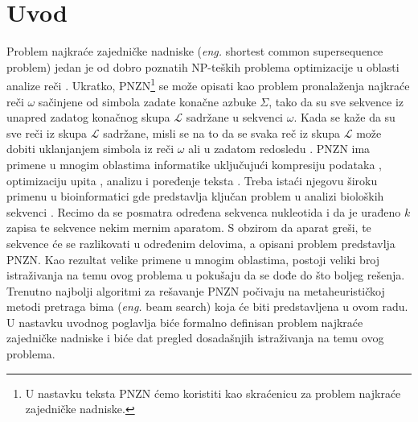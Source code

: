 \documentclass[12pt,oneside]{memoir}
\begin{document}
\frontmatter
\naslovna
\komisija
\apstrakt
\tableofcontents*

\mainmatter

\chapter{Uvod}
\label{chap:uvod}
Problem najkraće zajedničke nadniske (\textit{eng.} shortest common supersequence problem)
jedan je od dobro poznatih NP-teških problema optimizacije u oblasti analize reči \cite{ProbabilisticBS}.
Ukratko, PNZN\footnote{U nastavku teksta PNZN ćemo koristiti kao skraćenicu za problem najkraće zajedničke nadniske.}
se može opisati kao problem pronalaženja najkraće reči $\omega$ sačinjene
od simbola zadate konačne azbuke $\Sigma$, tako da su sve sekvence iz unapred zadatog konačnog skupa
$\mathcal{L}$ sadržane u sekvenci $\omega$. Kada se kaže da su sve reči iz skupa $\mathcal{L}$
sadržane, misli se na to da se svaka reč iz skupa $\mathcal{L}$ može dobiti uklanjanjem simbola iz reči $\omega$ ali 
u zadatom redosledu \cite{SCSSProblemDef}. PNZN ima primene u mnogim oblastima informatike uključujući kompresiju podataka
\cite{DataCompression}, optimizaciju upita \cite{MQOptimization}, analizu i poređenje teksta \cite{ITAlgorithms} \cite{SeqComparison}.
Treba istaći njegovu široku primenu u bioinformatici gde predstavlja
ključan problem u analizi bioloških sekvenci \cite{SCSSBetterSolution}.
Recimo da se posmatra određena sekvenca nukleotida i da
je urađeno $k$ zapisa te sekvence nekim mernim aparatom.
S obzirom da aparat greši, te sekvence će se razlikovati u određenim
delovima, a opisani problem predstavlja PNZN.
Kao rezultat velike primene u mnogim oblastima, postoji veliki broj istraživanja na temu ovog problema u pokušaju da se dođe
do što boljeg rešenja. Trenutno najbolji algoritmi za rešavanje PNZN počivaju na metaheurističkoj metodi
pretraga bima (\textit{eng.} beam search) koja će biti predstavljena u ovom radu. U nastavku uvodnog poglavlja biće formalno
definisan problem najkraće zajedničke nadniske i biće dat pregled dosadašnjih istraživanja na temu ovog problema.
\end{document}
